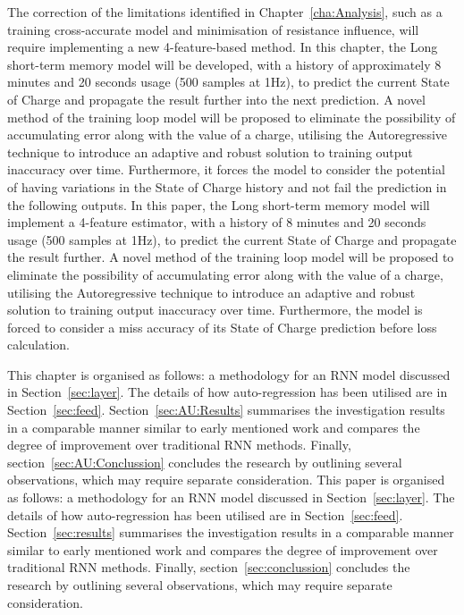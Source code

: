 %
{
    The correction of the limitations identified in Chapter~\ref{cha:Analysis}, such as a training cross-accurate model and minimisation of resistance influence, will require implementing a new 4-feature-based method.
    In this chapter, the Long short-term memory model will be developed, with a history of approximately 8 minutes and 20 seconds usage (500 samples at 1Hz), to predict the current State of Charge and propagate the result further into the next prediction.
    A novel method of the training loop model will be proposed to eliminate the possibility of accumulating error along with the value of a charge, utilising the Autoregressive technique to introduce an adaptive and robust solution to training output inaccuracy over time.
    Furthermore, it forces the model to consider the potential of having variations in the State of Charge history and not fail the prediction in the following outputs.
} {
    In this paper, the Long short-term memory model will implement a 4-feature estimator, with a history of 8 minutes and 20 seconds usage (500 samples at 1Hz), to predict the current State of Charge and propagate the result further.
    A novel method of the training loop model will be proposed to eliminate the possibility of accumulating error along with the value of a charge, utilising the Autoregressive technique to introduce an adaptive and robust solution to training output inaccuracy over time.
    Furthermore, the model is forced to consider a miss accuracy of its State of Charge prediction before loss calculation.
}

%
%
{
    This chapter is organised as follows: a methodology for an RNN model discussed in Section~\ref{sec:layer}.
    The details of how auto-regression has been utilised are in Section~\ref{sec:feed}.
    Section~\ref{sec:AU:Results} summarises the investigation results in a comparable manner similar to early mentioned work and compares the degree of improvement over traditional RNN methods.
    Finally, section~\ref{sec:AU:Conclussion} concludes the research by outlining several observations, which may require separate consideration.
} {
    This paper is organised as follows: a methodology for an RNN model discussed in Section~\ref{sec:layer}.
    The details of how auto-regression has been utilised are in Section~\ref{sec:feed}.
    Section~\ref{sec:results} summarises the investigation results in a comparable manner similar to early mentioned work and compares the degree of improvement over traditional RNN methods.
    Finally, section~\ref{sec:conclussion} concludes the research by outlining several observations, which may require separate consideration.
}
